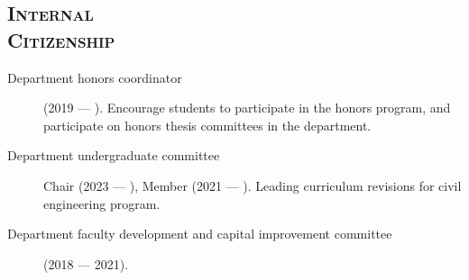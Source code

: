 \documentclass[margin,line]{res}
\newcommand{\secfont}{\scshape }
\begin{document}
\begin{resume}
\noindent\makebox[\linewidth]{\rule{\linewidth}{0.4pt}}
\section{\secfont Internal \\ Citizenship}
\begin{description}
  \item[Department honors coordinator] (2019 --- ). Encourage students to participate
  in the honors program, and participate on honors thesis committees in the
  department.
  \item[Department undergraduate committee] Chair (2023 --- ), Member (2021 --- ). Leading curriculum revisions for civil engineering program.
  \item[Department faculty development and capital improvement committee] (2018 --- 2021).
\end{description}






\end{resume}
\end{document}
